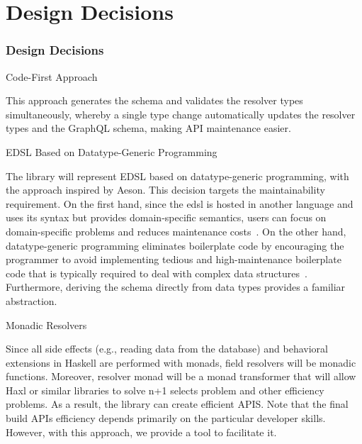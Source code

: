 
\section{Design Decisions} 

\begin{frame}\frametitle{Design Decisions}
\begin{alertblock}{Code-First Approach}  

This approach generates the schema and validates the resolver types simultaneously, whereby a single type change automatically updates the resolver types and the GraphQL schema, making API maintenance easier.

\end{alertblock}

\begin{alertblock}{EDSL Based on Datatype-Generic Programming}  

The library will represent EDSL based on datatype-generic programming, with the approach inspired by Aeson. This decision targets the maintainability requirement. On the first hand, since the edsl is hosted in another language and uses its syntax but provides domain-specific semantics, users can focus on domain-specific problems and reduces maintenance costs~\cite{edsl-modeling}. On the other hand, datatype-generic programming eliminates boilerplate code by encouraging the programmer to avoid implementing tedious and high-maintenance boilerplate code that is typically required to deal with complex data structures~\cite{scrap-your-boilerplate}.
Furthermore, deriving the schema directly from data types provides a familiar abstraction.

\end{alertblock}

\begin{alertblock}{Monadic Resolvers} 


Since all side effects (e.g., reading data from the database) and behavioral extensions in Haskell are performed with monads, field resolvers will be monadic functions. Moreover, resolver monad will be a monad transformer  that will allow Haxl or similar libraries to solve n+1 selects problem  and other efficiency problems. As a result, the library can create efficient APIS.  Note that the final build APIs efficiency depends primarily on the particular developer skills. However, with this approach, we provide a tool to facilitate it. 

\end{alertblock}



\end{frame}
